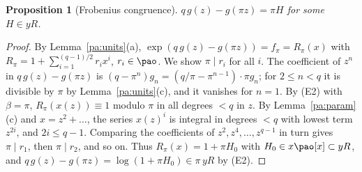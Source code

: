 \documentclass[10pt]{amsart}
\newtheorem{proposition}[theorem]{Proposition}
\theoremstyle{definition}
\theoremstyle{remark}
\begin{document}
\begin{proposition}[Frobenius congruence]\label{pa:frob}
$q\,g(z)-g(\pi z)=\pi H$ for some $H\in yR$.
\end{proposition}
\begin{proof}
By Lemma~\ref{pa:units}(a), $\exp(q\,g(z)-g(\pi z))=f_\pi=R_\pi(x)$ with $R_\pi=1+\sum_{i=1}^{(q-1)/2}
r_ix^i$, $r_i\in\pao$. We show $\pi\mid r_i$ for all $i$. The coefficient of $z^n$ in
$q\,g(z)-g(\pi z)$ is $(q-\pi^n)g_n=(q/\pi-\pi^{n-1})\cdot\pi g_n$; for $2\le n<q$ it is divisible
by $\pi$ by Lemma~\ref{pa:units}(c), and it vanishes for $n=1$. By (E2) with $\beta=\pi$,
$R_\pi(x(z))\equiv1$ modulo $\pi$ in all degrees $<q$ in $z$. By Lemma~\ref{pa:param}(c) and
$x=z^2+\dots$, the series $x(z)^i$ is integral in degrees $<q$ with lowest term $z^{2i}$, and
$2i\le q-1$. Comparing the coefficients of $z^2,z^4,\dots,z^{q-1}$ in turn gives $\pi\mid r_1$, then
$\pi\mid r_2$, and so on. Thus $R_\pi(x)=1+\pi H_0$ with $H_0\in x\pao[x]\subset yR$, and
$q\,g(z)-g(\pi z)=\log(1+\pi H_0)\in\pi\,yR$ by (E2).
\end{proof}
\end{document}
